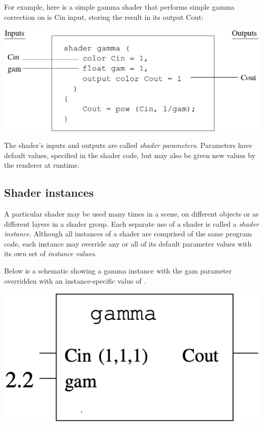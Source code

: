\documentclass[11pt,letterpaper]{book}
\begin{document}
For example, here is a simple {\cf gamma} shader that performs
simple gamma correction on is {\cf Cin} input, storing the result
in its output {\cf Cout}:
\bigskip

\includegraphics{Figures/shaderschematic}

\medskip

The shader's inputs and outputs are called \emph{shader parameters}.  
Parameters have default values, specified in the shader code, but may
also be given new values by the renderer at runtime.  

\subsection*{Shader instances}

A particular shader may be used many times in a scene, on different
objects or as different layers in a shader group.  Each separate use of
a shader is called a \emph{shader instance}.  Although all instances of
a shader are comprised of the same program code, each instance may
override any or all of its default parameter values with its own set of
\emph{instance values}.

Below is a
schematic showing a {\cf gamma} instance with the {\cf gam} parameter
overridden with an instance-specific value of {}.

\bigskip

\bigspc\spc \includegraphics{Figures/instanceschematic}
\end{document}
